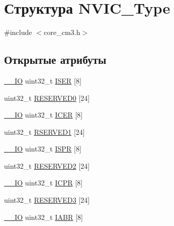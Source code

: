 \hypertarget{struct_n_v_i_c___type}{}\section{Структура N\+V\+I\+C\+\_\+\+Type}
\label{struct_n_v_i_c___type}


{\ttfamily \#include $<$core\+\_\+cm3.\+h$>$}

\subsection*{Открытые атрибуты}
\begin{DoxyCompactItemize}
\item 
\mbox{\hyperlink{group___c_m_s_i_s___c_m3__core__definitions_gaec43007d9998a0a0e01faede4133d6be}{\+\_\+\+\_\+\+IO}} uint32\+\_\+t \mbox{\hyperlink{struct_n_v_i_c___type_af90c80b7c2b48e248780b3781e0df80f}{I\+S\+ER}} \mbox{[}8\mbox{]}
\item 
uint32\+\_\+t \mbox{\hyperlink{struct_n_v_i_c___type_a2de17698945ea49abd58a2d45bdc9c80}{R\+E\+S\+E\+R\+V\+E\+D0}} \mbox{[}24\mbox{]}
\item 
\mbox{\hyperlink{group___c_m_s_i_s___c_m3__core__definitions_gaec43007d9998a0a0e01faede4133d6be}{\+\_\+\+\_\+\+IO}} uint32\+\_\+t \mbox{\hyperlink{struct_n_v_i_c___type_a1965a2e68b61d2e2009621f6949211a5}{I\+C\+ER}} \mbox{[}8\mbox{]}
\item 
uint32\+\_\+t \mbox{\hyperlink{struct_n_v_i_c___type_a6d1daf7ab6f2ba83f57ff67ae6f571fe}{R\+S\+E\+R\+V\+E\+D1}} \mbox{[}24\mbox{]}
\item 
\mbox{\hyperlink{group___c_m_s_i_s___c_m3__core__definitions_gaec43007d9998a0a0e01faede4133d6be}{\+\_\+\+\_\+\+IO}} uint32\+\_\+t \mbox{\hyperlink{struct_n_v_i_c___type_acf8e38fc2e97316242ddeb7ea959ab90}{I\+S\+PR}} \mbox{[}8\mbox{]}
\item 
uint32\+\_\+t \mbox{\hyperlink{struct_n_v_i_c___type_a0953af43af8ec7fd5869a1d826ce5b72}{R\+E\+S\+E\+R\+V\+E\+D2}} \mbox{[}24\mbox{]}
\item 
\mbox{\hyperlink{group___c_m_s_i_s___c_m3__core__definitions_gaec43007d9998a0a0e01faede4133d6be}{\+\_\+\+\_\+\+IO}} uint32\+\_\+t \mbox{\hyperlink{struct_n_v_i_c___type_a46241be64208436d35c9a4f8552575c5}{I\+C\+PR}} \mbox{[}8\mbox{]}
\item 
uint32\+\_\+t \mbox{\hyperlink{struct_n_v_i_c___type_a9dd330835dbf21471e7b5be8692d77ab}{R\+E\+S\+E\+R\+V\+E\+D3}} \mbox{[}24\mbox{]}
\item 
\mbox{\hyperlink{group___c_m_s_i_s___c_m3__core__definitions_gaec43007d9998a0a0e01faede4133d6be}{\+\_\+\+\_\+\+IO}} uint32\+\_\+t \mbox{\hyperlink{struct_n_v_i_c___type_a33e917b381e08dabe4aa5eb2881a7c11}{I\+A\+BR}} \mbox{[}8\mbox{]}

\end{DoxyCompactItemize}

